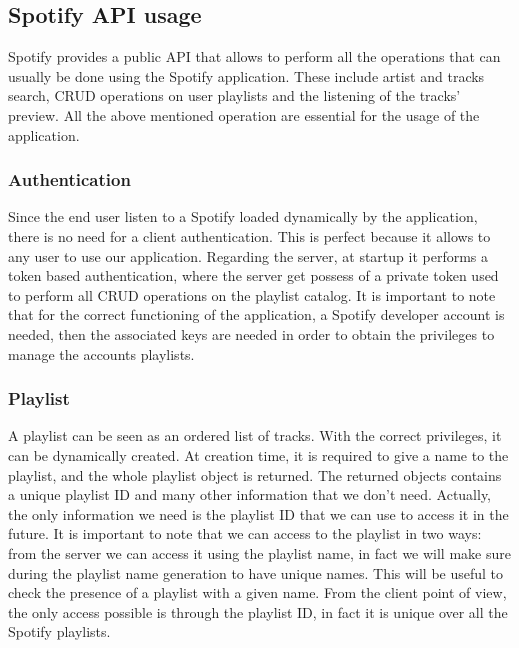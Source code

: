 \documentclass[paper=a4, fontsize=11pt]{scrartcl}
\begin{document}
\subsection{Spotify API usage}
Spotify provides a public API that allows to perform all the operations that can usually be done using the Spotify application. These include artist and tracks search, CRUD operations on user playlists and the listening of the tracks' preview.
All the above mentioned operation are essential for the usage of the application.
\subsubsection{Authentication}
Since the end user listen to a Spotify loaded dynamically by the application, there is no need for a client authentication. This is perfect because it allows to any user to use our application. Regarding the server, at startup it performs a token based authentication, where the server get possess of a private token used to perform all CRUD operations on the playlist catalog.
It is important to note that for the correct functioning of the application, a Spotify developer account is needed, then the associated keys are needed in order to obtain the privileges to manage the accounts playlists.
\subsubsection{Playlist}
A playlist can be seen as an ordered list of tracks. With the correct privileges, it can be dynamically created. At creation time, it is required to give a name to the playlist, and the whole playlist object is returned. The returned objects contains a unique playlist ID and many other information that we don't need. Actually, the only information we need is the playlist ID that we can use to access it in the future. It is important to note that we can access to the playlist in two ways: from the server we can access it using the playlist name, in fact we will make sure during the playlist name generation to have unique names. This will be useful to check the presence of a playlist with a given name. From the client point of view, the only access possible is through the playlist ID, in fact it is unique over all the Spotify playlists.
\end{document}
